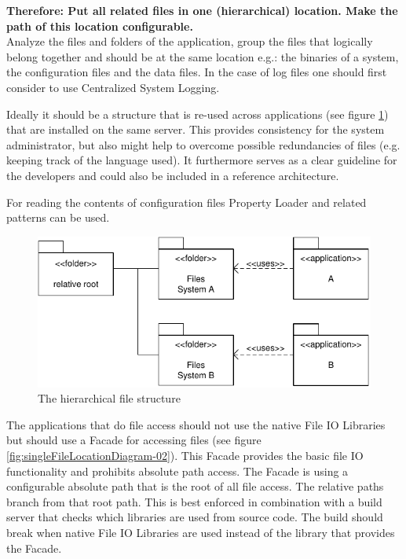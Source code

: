 \textbf{Therefore: Put all related files in one (hierarchical) location. Make the path of this location configurable.}\\

Analyze the files and folders of the application, group the files that logically belong together and should be at the same location e.g.: the binaries of a system, the configuration files and the data files. In the case of log files one should first consider to use {\sc Centralized System Logging}.

Ideally it should be a structure that is re-used across applications (see figure \ref{fig:singleFileLocationDiagram-01}) that are installed on the same server. This provides consistency for the system administrator, but also might help to overcome possible redundancies of files (e.g. keeping track of the language used). It furthermore serves as a clear guideline for the developers and could also be included in a reference architecture.

For reading the contents of configuration files {\sc Property Loader} and related patterns \cite{Wellhausen2010} can be used. 

\begin{figure}[h]
\centering
\includegraphics{patterns/singleFileLocationDiagram-01.pdf}
\caption{The hierarchical file structure}
\label{fig:singleFileLocationDiagram-01}
\end{figure}

The applications that do file access should not use the native File IO Libraries but should use a {\sc Facade} \cite{Gamma95} for accessing files (see figure \ref{fig:singleFileLocationDiagram-02}). This {\sc Facade} provides the basic file IO functionality and prohibits absolute path access. The {\sc Facade} is using a configurable absolute path that is the root of all file access. The relative paths branch from that root path.  This is best enforced in combination with a build server that checks which libraries are used from source code. The build should break when native File IO Libraries are used instead of the library that provides the {\sc Facade}. 

